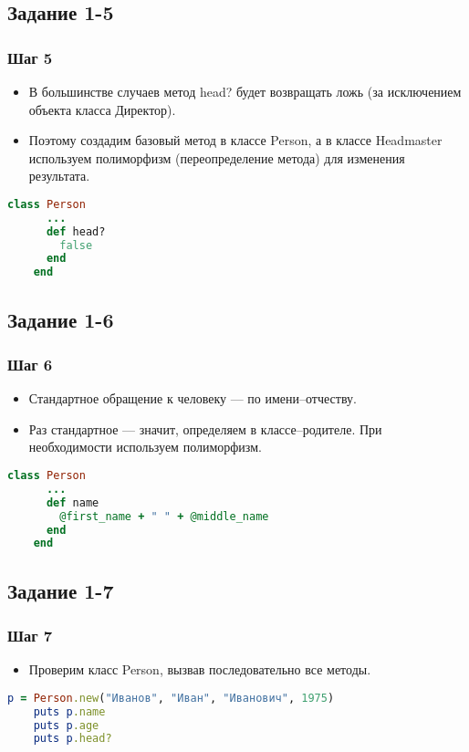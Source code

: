 \documentclass[compress,red]{beamer}
\begin{document}
\subsection{Задание 1-5}
\begin{frame}[fragile]
  \frametitle{Шаг 5}
  \begin{itemize}
    \item В большинстве случаев метод head? будет возвращать ложь (за исключением объекта класса Директор).
    \item Поэтому создадим базовый метод в классе Person, а в классе Headmaster используем полиморфизм (переопределение метода) для изменения результата.
  \end{itemize}
  \scriptsize{
  \begin{lstlisting}[language=ruby,basicstyle=\footnotesize,label=ruby5,caption=Метод head]
    class Person
      ...
      def head?
        false
      end
    end
  \end{lstlisting}
  }
\end{frame}

\subsection{Задание 1-6}
\begin{frame}[fragile]
  \frametitle{Шаг 6}
  \begin{itemize}
    \item Стандартное обращение к человеку --- по имени--отчеству. 
    \item Раз стандартное --- значит, определяем в классе--родителе. При необходимости используем полиморфизм.
  \end{itemize}
  
  \scriptsize{
  \begin{lstlisting}[language=ruby,basicstyle=\footnotesize,label=ruby6,caption=Метод name]
    class Person
      ...
      def name
        @first_name + " " + @middle_name
      end
    end
  \end{lstlisting}
  }
\end{frame}

\subsection{Задание 1-7}
\begin{frame}[fragile]
  \frametitle{Шаг 7}
  \begin{itemize}
    \item Проверим класс Person, вызвав последовательно все методы.
  \end{itemize}
  \scriptsize{
  \begin{lstlisting}[language=ruby,basicstyle=\footnotesize,label=ruby7,caption=Person]
    p = Person.new("Иванов", "Иван", "Иванович", 1975)
    puts p.name
    puts p.age
    puts p.head?
  \end{lstlisting}
  }
\end{frame}
\end{document}
